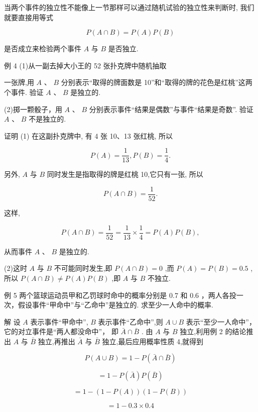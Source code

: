\documentclass[10pt]{article}
\begin{document}
当两个事件的独立性不能像上一节那样可以通过随机试验的独立性来判断时, 我们就要直接用等式

\[
P\left( {A \cap  B}\right)  = P\left( A\right) P\left( B\right)
\]

是否成立来检验两个事件 \(A\) 与 \(B\) 是否独立.

例 4 (1)从一副去掉大小王的 52 张扑克牌中随机抽取

一张牌,用 \(A\text{ 、 }B\) 分别表示“取得的牌面数是 10”和“取得的牌的花色是红桃”这两个事件. 验证 \(A\text{ 、 }B\) 是独立的.

(2)掷一颗骰子，用 \(A\text{ 、 }B\) 分别表示事件“结果是偶数”与事件“结果是奇数”. 验证 \(A\) 、 \(B\) 不是独立的.

证明 (1) 在这副扑克牌中, 有 4 张 10、13 张红桃, 所以

\[
P\left( A\right)  = \frac{1}{13},P\left( B\right)  = \frac{1}{4}.
\]

另外, \(A\) 与 \(B\) 同时发生是指取得的牌是红桃 10,它只有一张, 所以

\[
P\left( {A \cap  B}\right)  = \frac{1}{52}.
\]

这样,

\[
P\left( {A \cap  B}\right)  = \frac{1}{52} = \frac{1}{13} \times  \frac{1}{4} = P\left( A\right) P\left( B\right) ,
\]

从而事件 \(A\text{ 、 }B\) 是独立的.

(2)这时 \(A\) 与 \(B\) 不可能同时发生,即 \(P\left( {A \cap  B}\right)  = 0\) ,而 \(P\left( A\right)  = P\left( B\right)  = {0.5}\) ,所以 \(P\left( {A \cap  B}\right)  \neq  P\left( A\right) P\left( B\right)\) ,即 \(A\) 与 \(B\) 不独立.

例 5 两个篮球运动员甲和乙罚球时命中的概率分别是 0.7 和 0.6 ，两人各投一次，假设事件“甲命中”与“乙命中”是独立的. 求至少一人命中的概率.

解 设 \(A\) 表示事件“甲命中”, \(B\) 表示事件“乙命中”,则 \(A \cup  B\) 表示“至少一人命中”，它的对立事件是“两人都没命中”， 即 \(\bar{A} \cap  \bar{B}\) . 由 \(A\) 与 \(B\) 独立,利用例 2 的结论推出 \(A\) 与 \(\bar{B}\) 独立,再推出 \(\bar{A}\) 与 \(\bar{B}\) 独立,最后应用概率性质 4,就得到

\[
P\left( {A \cup  B}\right)  = 1 - P\left( {\bar{A} \cap  \bar{B}}\right)
\]

\[
= 1 - P\left( \bar{A}\right) P\left( \bar{B}\right)
\]

\[
= 1 - \left( {1 - P\left( A\right) }\right) \left( {1 - P\left( B\right) }\right)
\]

\[
= 1 - {0.3} \times  {0.4}
\]
\end{document}
